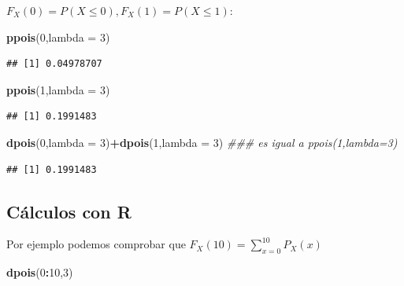 \documentclass[]{book}
\newenvironment{Shaded}{\begin{snugshade}}{\end{snugshade}}
\newcommand{\CommentTok}[1]{\textcolor[rgb]{0.56,0.35,0.01}{\textit{#1}}}
\newcommand{\DataTypeTok}[1]{\textcolor[rgb]{0.13,0.29,0.53}{#1}}
\newcommand{\DecValTok}[1]{\textcolor[rgb]{0.00,0.00,0.81}{#1}}
\newcommand{\KeywordTok}[1]{\textcolor[rgb]{0.13,0.29,0.53}{\textbf{#1}}}
\newcommand{\NormalTok}[1]{#1}
\newcommand{\OperatorTok}[1]{\textcolor[rgb]{0.81,0.36,0.00}{\textbf{#1}}}
\begin{document}
\(F_X(0)=P(X\leq 0), F_X(1)=P(X\leq 1)\):

\begin{Shaded}
\begin{Highlighting}[]
\KeywordTok{ppois}\NormalTok{(}\DecValTok{0}\NormalTok{,}\DataTypeTok{lambda =} \DecValTok{3}\NormalTok{)}
\end{Highlighting}
\end{Shaded}

\begin{verbatim}
## [1] 0.04978707
\end{verbatim}

\begin{Shaded}
\begin{Highlighting}[]
\KeywordTok{ppois}\NormalTok{(}\DecValTok{1}\NormalTok{,}\DataTypeTok{lambda =} \DecValTok{3}\NormalTok{)}
\end{Highlighting}
\end{Shaded}

\begin{verbatim}
## [1] 0.1991483
\end{verbatim}

\begin{Shaded}
\begin{Highlighting}[]
\KeywordTok{dpois}\NormalTok{(}\DecValTok{0}\NormalTok{,}\DataTypeTok{lambda =} \DecValTok{3}\NormalTok{)}\OperatorTok{+}\KeywordTok{dpois}\NormalTok{(}\DecValTok{1}\NormalTok{,}\DataTypeTok{lambda =} \DecValTok{3}\NormalTok{) }\CommentTok{### es igual a ppois(1,lambda=3)}
\end{Highlighting}
\end{Shaded}

\begin{verbatim}
## [1] 0.1991483
\end{verbatim}

\hypertarget{cuxe1lculos-con-r-6}{%
\subsection{Cálculos con R}\label{cuxe1lculos-con-r-6}}

Por ejemplo podemos comprobar que \(F_X(10)=\sum_{x=0}^{10} P_X(x)\)

\begin{Shaded}
\begin{Highlighting}[]
\KeywordTok{dpois}\NormalTok{(}\DecValTok{0}\OperatorTok{:}\DecValTok{10}\NormalTok{,}\DecValTok{3}\NormalTok{)}
\end{Highlighting}
\end{Shaded}
\end{document}
